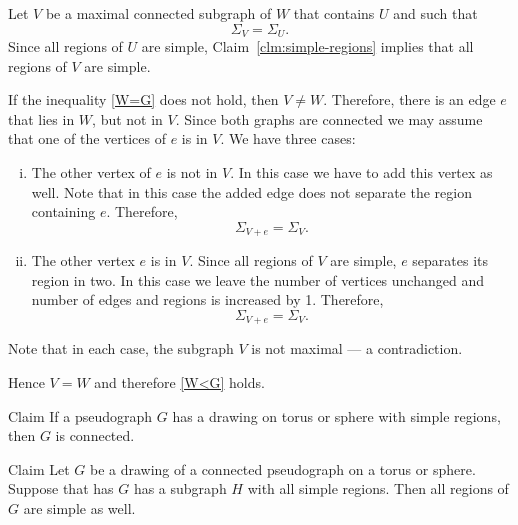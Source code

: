  Let $V$ be a maximal connected subgraph of $W$ that contains $U$ and such that 
\[\Sigma_V= \Sigma_U.\]
Since all regions of $U$ are simple, Claim~\ref{clm:simple-regions} implies that all regions of $V$ are simple.

If the inequality \ref{W=G} does not hold, then $V\ne W$.
Therefore, there is an edge $e$ that lies in $W$, but not in $V$.
Since both graphs are connected we may assume that one of the vertices of $e$ is in $V$.
We have three cases:
\begin{enumerate}[(i)]
\item The other vertex of $e$ is not in $V$.
In this case we have to add this vertex as well.
Note that in this case the added edge does not separate the region containing $e$.
Therefore, 
\[\Sigma_{V+e}=\Sigma_{V}.\]
\item The other vertex $e$ is in $V$.
Since all regions of $V$ are simple, $e$ separates its region in two.
In this case we leave the number of vertices unchanged and number of edges and regions is increased by 1.
Therefore, 
\[\Sigma_{V+e}=\Sigma_{V}.\] 
\end{enumerate}
Note that in each case, the subgraph $V$ is not maximal --- a contradiction.

Hence $V=W$ and therefore \ref{W<G} holds.
\qeds






















\begin{thm}{Claim}\label{clm:simple-connected}
If a pseudograph $G$ has a drawing on torus or sphere with simple regions, then $G$ is connected. 
\end{thm}


\begin{thm}{Claim}\label{clm:simple-regions}
Let $G$ be a drawing of a connected pseudograph on a torus or sphere.
Suppose that has $G$ has a subgraph $H$ with all simple regions.
Then all regions of $G$ are simple as well.
\end{thm}

















